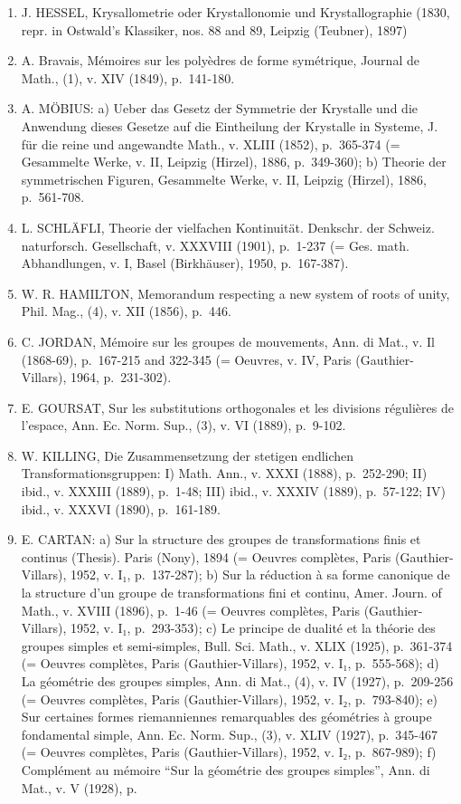 \begin{enumerate}
\def\labelenumi{(\Roman{enumi})}
\item
  J. HESSEL, Krysallometrie oder Krystallonomie und Krystallographie (1830, repr. in Ostwald's Klassiker, nos. 88 and 89, Leipzig (Teubner), 1897)
\item
  A. Bravais, Mémoires sur les polyèdres de forme symétrique, Journal de Math., (1), v. XIV (1849), p.~141-180.
\item
  A. MÖBIUS: a) Ueber das Gesetz der Symmetrie der Krystalle und die Anwendung dieses Gesetze auf die Eintheilung der Krystalle in Systeme, J. für die reine und angewandte Math., v. XLIII (1852), p.~365-374 (= Gesammelte Werke, v. II, Leipzig (Hirzel), 1886, p.~349-360); b) Theorie der symmetrischen Figuren, Gesammelte Werke, v. II, Leipzig (Hirzel), 1886, p.~561-708.
\item
  L. SCHLÄFLI, Theorie der vielfachen Kontinuität. Denkschr. der Schweiz. naturforsch. Gesellschaft, v. XXXVIII (1901), p.~1-237 (= Ges. math. Abhandlungen, v. I, Basel (Birkhäuser), 1950, p.~167-387).
\item
  W. R. HAMILTON, Memorandum respecting a new system of roots of unity, Phil. Mag., (4), v. XII (1856), p.~446.
\item
  C. JORDAN, Mémoire sur les groupes de mouvements, Ann. di Mat., v. Il (1868-69), p.~167-215 and 322-345 (= Oeuvres, v. IV, Paris (Gauthier-Villars), 1964, p.~231-302).
\item
  E. GOURSAT, Sur les substitutions orthogonales et les divisions régulières de l'espace, Ann. Ec. Norm. Sup., (3), v. VI (1889), p.~9-102.
\item
  W. KILLING, Die Zusammensetzung der stetigen endlichen Transformationsgruppen: I) Math. Ann., v. XXXI (1888), p.~252-290; II) ibid., v. XXXIII (1889), p.~1-48; III) ibid., v. XXXIV (1889), p.~57-122; IV) ibid., v. XXXVI (1890), p.~161-189.
\item
  E. CARTAN: a) Sur la structure des groupes de transformations finis et continus (Thesis). Paris (Nony), 1894 (= Oeuvres complètes, Paris (Gauthier-Villars), 1952, v. I₁, p.~137-287); b) Sur la réduction à sa forme canonique de la structure d'un groupe de transformations fini et continu, Amer. Journ. of Math., v. XVIII (1896), p.~1-46 (= Oeuvres complètes, Paris (Gauthier-Villars), 1952, v. I₁, p.~293-353); c) Le principe de dualité et la théorie des groupes simples et semi-simples, Bull. Sci. Math., v. XLIX (1925), p.~361-374 (= Oeuvres complètes, Paris (Gauthier-Villars), 1952, v. I₁, p.~555-568); d) La géométrie des groupes simples, Ann. di Mat., (4), v. IV (1927), p.~209-256 (= Oeuvres complètes, Paris (Gauthier-Villars), 1952, v. I₂, p.~793-840); e) Sur certaines formes riemanniennes remarquables des géométries à groupe fondamental simple, Ann. Ec. Norm. Sup., (3), v. XLIV (1927), p.~345-467 (= Oeuvres complètes, Paris (Gauthier-Villars), 1952, v. I₂, p.~867-989); f) Complément au mémoire ``Sur la géométrie des groupes simples'', Ann. di Mat., v. V (1928), p.
\end{enumerate}

